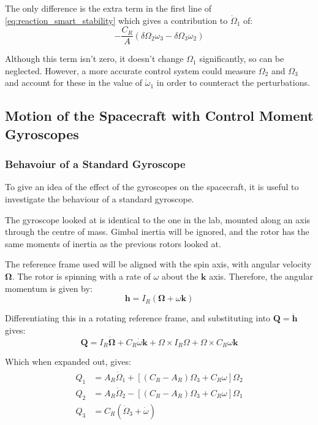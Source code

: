 \documentclass[12]{article}
\begin{document}
\begin{multicols*}{2}
The only difference is the extra term in the first line of \cref{eq:reaction_smart_stability} which gives a contribution to $\dot{\Omega}_1$ of:
$$-\frac{C_R}{A}(\delta\Omega_2\omega_3 - \delta\Omega_3\omega_2)$$

Although this term isn't zero, it doesn't change $\Omega_1$ significantly, so can be neglected. However, a more accurate control system could measure $\Omega_2$ and $\Omega_3$ and account for these in the value of $\dot{\omega}_1$ in order to counteract the perturbations.

\subsection{Motion of the Spacecraft with Control Moment Gyroscopes}

\subsubsection{Behavoiur of a Standard Gyroscope}

To give an idea of the effect of the gyroscopes on the spacecraft, it is useful to investigate the behaviour of a standard gyroscope.

The gyroscope looked at is identical to the one in the lab, mounted along an axis through the centre of mass. Gimbal inertia will be ignored, and the rotor has the same moments of inertia as the previous rotors looked at.

The reference frame used will be aligned with the spin axis, with angular velocity $\bm{\Omega}$. The rotor is spinning with a rate of $\omega$ about the $\bm{k}$ axis. Therefore, the angular momentum is given by:
\begin{equation} \label{eq:gyro_h}
\bm{h} = I_R(\bm{\Omega} + \omega\bm{k})
\end{equation}

Differentiating this in a rotating reference frame, and substituting into $\bm{Q} = \dot{\bm{h}}$ gives:
\begin{equation} \label{eq:gyro_eq_of_motion_vector}
\bm{Q} = I_R\dot{\bm{\Omega}} + C_R\dot{\omega}\bm{k} + \Omega \times I_R\Omega + \Omega \times C_R\omega\bm{k}
\end{equation}

Which when expanded out, gives:
\begin{align} \label{eq:gyro_eq_of_motion}
\begin{split}
Q_1 &= A_R\dot{\Omega}_1 + [(C_R-A_R)\Omega_3 + C_R\omega]\Omega_2 \\
Q_2 &= A_R\dot{\Omega}_2 - [(C_R-A_R)\Omega_3 + C_R\omega]\Omega_1 \\
Q_3 &= C_R(\dot{\Omega}_3 + \dot{\omega}) \\
\end{split}
\end{align}


\end{multicols*}
\end{document}

